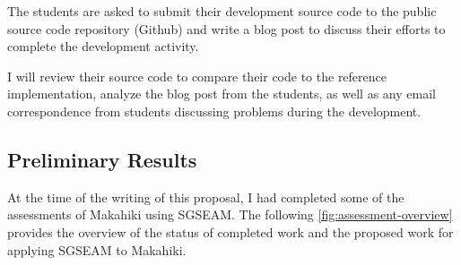 The students are asked to submit their development source code to the public source code repository (Github) and write a blog post to discuss their efforts to complete the development activity.

I will review their source code to compare their code to the reference implementation, analyze the blog post from the students, as well as any email correspondence from students discussing  problems during the development.

\subsection{Preliminary Results}

At the time of the writing of this proposal, I had completed some of the assessments of Makahiki using SGSEAM. The following \autoref{fig:assessment-overview} provides the overview of the status of completed work and the proposed work for applying SGSEAM to Makahiki.

